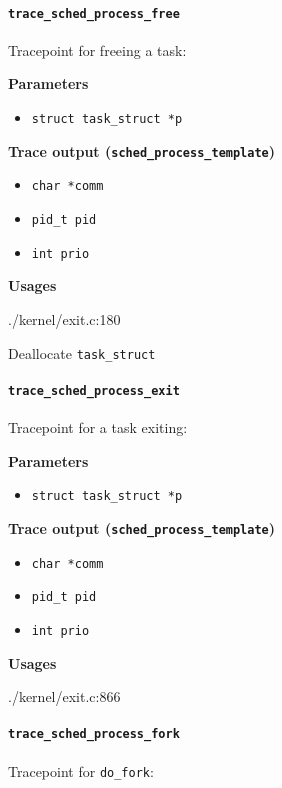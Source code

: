 \paragraph{\texttt{trace\_sched\_process\_free}}
Tracepoint for freeing a task:

\textbf{Parameters}
\begin{itemize}
    \item \verb|struct task_struct *p|
\end{itemize}

\textbf{Trace output (\texttt{sched\_process\_template})}
\begin{itemize}
    \item \verb|char *comm|
    \item \verb|pid_t pid|
    \item \verb|int prio|
\end{itemize}

\textbf{Usages}
\begin{code}
./kernel/exit.c:180
\end{code}
Deallocate \verb|task_struct|
  
\paragraph{\texttt{trace\_sched\_process\_exit}}
Tracepoint for a task exiting:

\textbf{Parameters}
\begin{itemize}
    \item \verb|struct task_struct *p|
\end{itemize}

\textbf{Trace output (\texttt{sched\_process\_template})}
\begin{itemize}
    \item \verb|char *comm|
    \item \verb|pid_t pid|
    \item \verb|int prio|
\end{itemize}

\textbf{Usages}
\begin{code}
./kernel/exit.c:866
\end{code}

  
\paragraph{\texttt{trace\_sched\_process\_fork}}
Tracepoint for \verb|do_fork|:

